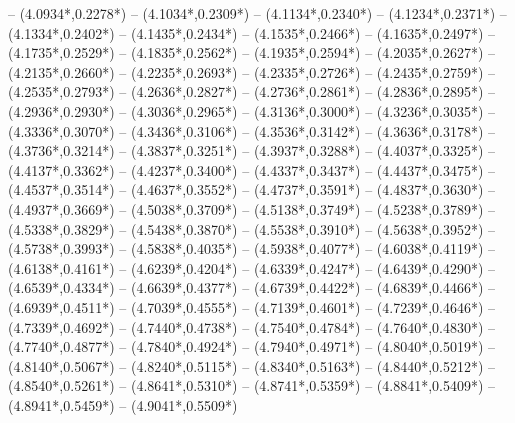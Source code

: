 {	-- ({4.0934*\dx},{0.2278*\dy})
	-- ({4.1034*\dx},{0.2309*\dy})
	-- ({4.1134*\dx},{0.2340*\dy})
	-- ({4.1234*\dx},{0.2371*\dy})
	-- ({4.1334*\dx},{0.2402*\dy})
	-- ({4.1435*\dx},{0.2434*\dy})
	-- ({4.1535*\dx},{0.2466*\dy})
	-- ({4.1635*\dx},{0.2497*\dy})
	-- ({4.1735*\dx},{0.2529*\dy})
	-- ({4.1835*\dx},{0.2562*\dy})
	-- ({4.1935*\dx},{0.2594*\dy})
	-- ({4.2035*\dx},{0.2627*\dy})
	-- ({4.2135*\dx},{0.2660*\dy})
	-- ({4.2235*\dx},{0.2693*\dy})
	-- ({4.2335*\dx},{0.2726*\dy})
	-- ({4.2435*\dx},{0.2759*\dy})
	-- ({4.2535*\dx},{0.2793*\dy})
	-- ({4.2636*\dx},{0.2827*\dy})
	-- ({4.2736*\dx},{0.2861*\dy})
	-- ({4.2836*\dx},{0.2895*\dy})
	-- ({4.2936*\dx},{0.2930*\dy})
	-- ({4.3036*\dx},{0.2965*\dy})
	-- ({4.3136*\dx},{0.3000*\dy})
	-- ({4.3236*\dx},{0.3035*\dy})
	-- ({4.3336*\dx},{0.3070*\dy})
	-- ({4.3436*\dx},{0.3106*\dy})
	-- ({4.3536*\dx},{0.3142*\dy})
	-- ({4.3636*\dx},{0.3178*\dy})
	-- ({4.3736*\dx},{0.3214*\dy})
	-- ({4.3837*\dx},{0.3251*\dy})
	-- ({4.3937*\dx},{0.3288*\dy})
	-- ({4.4037*\dx},{0.3325*\dy})
	-- ({4.4137*\dx},{0.3362*\dy})
	-- ({4.4237*\dx},{0.3400*\dy})
	-- ({4.4337*\dx},{0.3437*\dy})
	-- ({4.4437*\dx},{0.3475*\dy})
	-- ({4.4537*\dx},{0.3514*\dy})
	-- ({4.4637*\dx},{0.3552*\dy})
	-- ({4.4737*\dx},{0.3591*\dy})
	-- ({4.4837*\dx},{0.3630*\dy})
	-- ({4.4937*\dx},{0.3669*\dy})
	-- ({4.5038*\dx},{0.3709*\dy})
	-- ({4.5138*\dx},{0.3749*\dy})
	-- ({4.5238*\dx},{0.3789*\dy})
	-- ({4.5338*\dx},{0.3829*\dy})
	-- ({4.5438*\dx},{0.3870*\dy})
	-- ({4.5538*\dx},{0.3910*\dy})
	-- ({4.5638*\dx},{0.3952*\dy})
	-- ({4.5738*\dx},{0.3993*\dy})
	-- ({4.5838*\dx},{0.4035*\dy})
	-- ({4.5938*\dx},{0.4077*\dy})
	-- ({4.6038*\dx},{0.4119*\dy})
	-- ({4.6138*\dx},{0.4161*\dy})
	-- ({4.6239*\dx},{0.4204*\dy})
	-- ({4.6339*\dx},{0.4247*\dy})
	-- ({4.6439*\dx},{0.4290*\dy})
	-- ({4.6539*\dx},{0.4334*\dy})
	-- ({4.6639*\dx},{0.4377*\dy})
	-- ({4.6739*\dx},{0.4422*\dy})
	-- ({4.6839*\dx},{0.4466*\dy})
	-- ({4.6939*\dx},{0.4511*\dy})
	-- ({4.7039*\dx},{0.4555*\dy})
	-- ({4.7139*\dx},{0.4601*\dy})
	-- ({4.7239*\dx},{0.4646*\dy})
	-- ({4.7339*\dx},{0.4692*\dy})
	-- ({4.7440*\dx},{0.4738*\dy})
	-- ({4.7540*\dx},{0.4784*\dy})
	-- ({4.7640*\dx},{0.4830*\dy})
	-- ({4.7740*\dx},{0.4877*\dy})
	-- ({4.7840*\dx},{0.4924*\dy})
	-- ({4.7940*\dx},{0.4971*\dy})
	-- ({4.8040*\dx},{0.5019*\dy})
	-- ({4.8140*\dx},{0.5067*\dy})
	-- ({4.8240*\dx},{0.5115*\dy})
	-- ({4.8340*\dx},{0.5163*\dy})
	-- ({4.8440*\dx},{0.5212*\dy})
	-- ({4.8540*\dx},{0.5261*\dy})
	-- ({4.8641*\dx},{0.5310*\dy})
	-- ({4.8741*\dx},{0.5359*\dy})
	-- ({4.8841*\dx},{0.5409*\dy})
	-- ({4.8941*\dx},{0.5459*\dy})
	-- ({4.9041*\dx},{0.5509*\dy})
}
